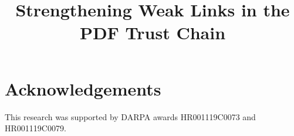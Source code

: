 \documentclass[conference,10pt]{IEEEtran}
\begin{document}
\date{}

\title{Strengthening Weak Links in the PDF Trust Chain}

\author{
     \and
}

\maketitle
\thispagestyle{plain} %



\begin{comment}
CONVENTION:
 - using this lstlisting[style=meta] environment to capture
   text in outline form that has not been fleshed ourelt / turned into prose.

META NOTES:  
- aim for 12 pages (in 10pt) (langsec specifies no limit)

TERMS (to actually use, and define when needed):
- ``complies with standard'', ``compatible with standard''
- Pre-DOM
- XRef (capitalized thus)
- Trust Chain (no quotes) [remove upper case?]
- parser differential
\end{comment}

















\section*{Acknowledgements}

This research was supported by DARPA awards HR001119C0073 and
HR001119C0079.





\appendix


\end{document}
